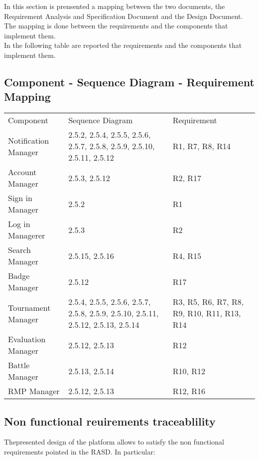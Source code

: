 In this section is prensented a mapping between the two documents, the Requirement Analysis and Specification Document and the Design Document. The mapping is done between the requirements and the components that implement them.\\
In the following table are reported the requirements and the components that implement them.\\
\subsection{Component - Sequence Diagram - Requirement Mapping} \label{uc:mapping}
\begin{center}
    \begin{tabu}{|X[.25]|X[.4]|X[.2]|} \hline \everyrow{\hline}
        Component & Sequence Diagram & Requirement \\
        Notification Manager & 2.5.2, 2.5.4, 2.5.5, 2.5.6, 2.5.7, 2.5.8, 2.5.9, 2.5.10, 2.5.11, 2.5.12  & R1, R7, R8, R14\\ 
        Account Manager & 2.5.3, 2.5.12  & R2, R17\\
        Sign in Manager & 2.5.2 & R1\\
        Log in Managerer & 2.5.3 & R2\\
        Search Manager & 2.5.15, 2.5.16& R4, R15\\
        Badge Manager & 2.5.12 & R17\\
        Tournament Manager & 2.5.4, 2.5.5, 2.5.6, 2.5.7, 2.5.8, 2.5.9, 2.5.10, 2.5.11, 2.5.12, 2.5.13, 2.5.14 & R3, R5, R6, R7, R8, R9, R10, R11, R13, R14\\
        Evaluation Manager & 2.5.12, 2.5.13 & R12\\
        Battle Manager & 2.5.13, 2.5.14 & R10, R12\\
        RMP Manager & 2.5.12, 2.5.13 & R12, R16\\
    \end{tabu}
\end{center}

\subsection{Non functional reuirements traceablility}
Thepresented design of the platform allows to satisfy the non functional requirements pointed in the RASD. In particular:
